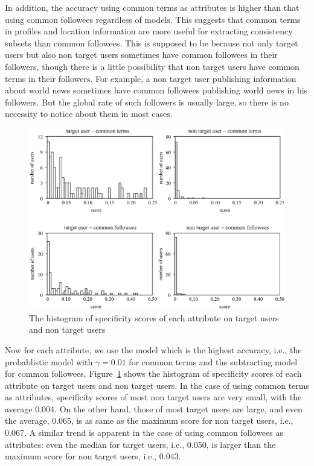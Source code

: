 In addition, the accuracy using common terms as attributes is higher
than that using common followees regardless of models.  This suggests
that common terms in profiles and location information are more useful for
extracting consistency subsets than common followees.  This is supposed
to be because not only target users but also non target users sometimes
have common followees in their followers, though there is a little
possibility that non target users have common terms in their followers.
For example, a non target user publishing information about world news
sometimes have common followees publishing world news in
his followers.  But the global rate of such followers is usually
large, so there is no necessity to notice about them in most
cases.

{\footnotesize
\begin{figure}[t]
\begin{center}
\includegraphics[width=14cm]{images/histogram.eps}
 \caption{The histogram of specificity scores of each attribute on
 target users and non target users}
\label{fig:histogram}
\end{center}
\end{figure}
}

Now for each attribute, we use the model which is the highest accuracy,
i.e., the probablistic model with $\gamma=0.01$ for common terms and the
subtracting model for common
followees. Figure~\ref{fig:histogram} shows the histogram of specificity
scores of each attribute on target users and non target users.  In the
case of using common terms as attributes, specificity scores of most
non target users are very small, with the average 0.004.  On the other
hand, those of most target users are large, and even the average, 0.065,
is as same as the maximum score for non target users, i.e., 0.067.  A
similar trend is apparent in the case of using common followees as
attributes: even the median for target users, i.e., 0.050, is larger
than the maximum score for non target users, i.e., 0.043.

